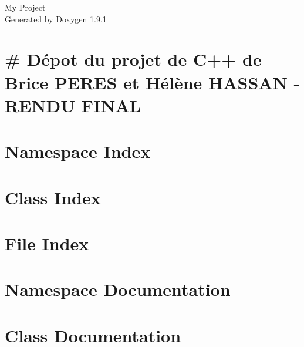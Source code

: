 \let\mypdfximage\pdfximage\def\pdfximage{\immediate\mypdfximage}\documentclass[twoside]{book}
\newcommand{\+}{\discretionary{\mbox{\scriptsize$\hookleftarrow$}}{}{}}
\newcommand{\clearemptydoublepage}{%
  \newpage{\pagestyle{empty}\cleardoublepage}%
}
\begin{document}
\raggedbottom

\hypersetup{pageanchor=false,
             bookmarksnumbered=true,
             pdfencoding=unicode
            }
\begin{titlepage}
\vspace*{7cm}
\begin{center}%
{\Large My Project }\\
\vspace*{1cm}
{\large Generated by Doxygen 1.9.1}\\
\end{center}
\end{titlepage}
\clearemptydoublepage
{}
\tableofcontents
\clearemptydoublepage
{}
\hypersetup{pageanchor=true}

\chapter{\# Dépot du projet de C++ de Brice PERES et Hélène HASSAN -\/ RENDU FINAL}
\label{md_README}

\chapter{Namespace Index}

\chapter{Class Index}

\chapter{File Index}

\chapter{Namespace Documentation}

\chapter{Class Documentation}











\end{document}
